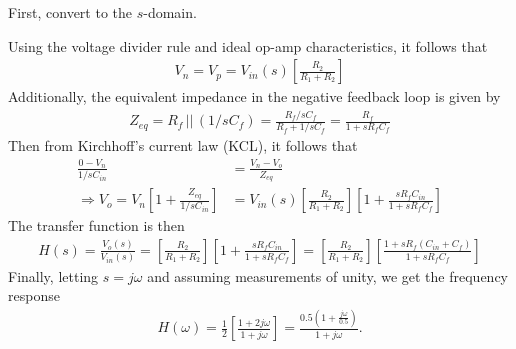 \documentclass{report}
\begin{document}
\begin{solution}
    First, convert to the $s$-domain.
    \begin{center}
    \end{center}
    Using the voltage divider rule and ideal op-amp characteristics, it follows that 
    \begin{align*}
        V_n = V_p = V_{in}(s)\left[\frac{R_2}{R_1+R_2}\right]
    \end{align*}
    Additionally, the equivalent impedance in the negative feedback loop is given by
    \begin{align*}
        Z_{eq} = R_f\, ||\, (1/sC_f) = \frac{R_f/sC_f}{R_f+1/sC_f} = \frac{R_f}{1+sR_fC_f}
    \end{align*}
    Then from Kirchhoff's current law (KCL), it follows that 
    \begin{align*}
        \frac{0-V_n}{1/sC_{in}} &= \frac{V_n-V_o}{Z_{eq}} \\
        \Longrightarrow V_o = V_n\left[1+\frac{Z_{eq}}{1/sC_{in}}\right] &= V_{in}(s)\left[\frac{R_2}{R_1+R_2}\right]\left[1+\frac{sR_fC_{in}}{1+sR_fC_f}\right]
    \end{align*}
    The transfer function is then 
    \begin{align*}
        H(s) = \frac{V_o(s)}{V_{in}(s)} = \left[\frac{R_2}{R_1+R_2}\right]\left[1+\frac{sR_fC_{in}}{1+sR_fC_f}\right] = \left[\frac{R_2}{R_1+R_2}\right]\left[\frac{1+sR_f(C_{in}+C_f)}{1+sR_fC_f}\right]
    \end{align*}
    Finally, letting $s=j\omega$ and assuming measurements of unity, we get the frequency response 
    \begin{align*}
        H(\omega) = \frac{1}{2}\left[\frac{1+2j\omega}{1+j\omega}\right] = \frac{0.5\left(1+\frac{j\omega}{0.5}\right)}{1+j\omega}.

\end{align*}
\end{solution}
\end{document}
